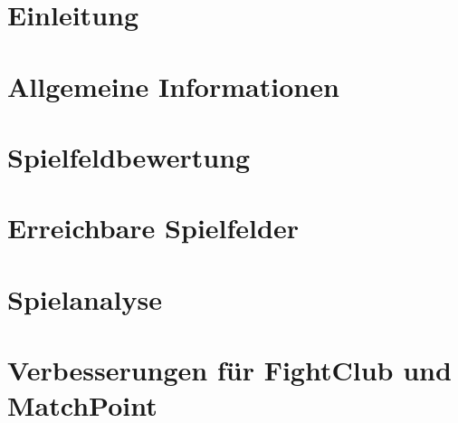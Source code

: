 \documentclass[12pt,a4paper,bibliography=totocnumbered,listof=totocnumbered]{article}
\begin{document}
\section{Einleitung}\label{sec:einleitung}


\section{Allgemeine Informationen}\label{sec:allgemeine-informationen}


\section{Spielfeldbewertung}\label{sec:spielfeldbewertung}


\section{Erreichbare Spielfelder}\label{sec:erreichbare-spielfelder}


\section{Spielanalyse}\label{sec:spielanalyse}


\section{Verbesserungen für FightClub und MatchPoint}\label{sec:verbesserungen}

\end{document}
